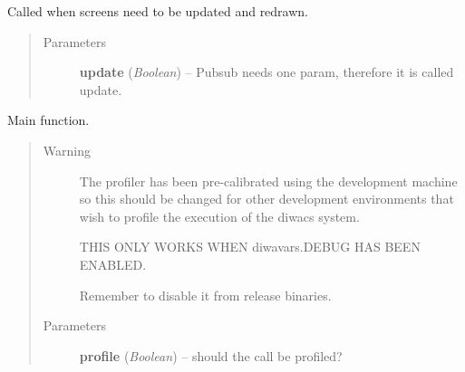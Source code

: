 \documentclass[letterpaper,10pt,english]{sphinxmanual}
\begin{document}
\begin{fulllineitems}
\begin{fulllineitems}
\begin{quote}
\begin{description}
\end{description}\end{quote}

\end{fulllineitems}


\begin{fulllineitems}
\label{diwacs:diwacs.GraphicalUserInterface.UpdateScreens}
Called when screens need to be updated and redrawn.
\begin{quote}\begin{description}
\item[{Parameters}] \leavevmode
\textbf{update} (\emph{Boolean}) -- Pubsub needs one param, therefore it is called update.

\end{description}\end{quote}

\end{fulllineitems}


\end{fulllineitems}


\begin{fulllineitems}
\label{diwacs:diwacs.main}
Main function.
\begin{quote}\begin{description}
\item[{Warning }] \leavevmode
The profiler has been pre-calibrated using the development machine
so this should be changed for other development environments that
wish to profile the execution of the diwacs system.

THIS ONLY WORKS WHEN diwavars.DEBUG HAS BEEN ENABLED.

Remember to disable it from release binaries.

\item[{Parameters}] \leavevmode
\textbf{profile} (\emph{Boolean}) -- should the call be profiled?

\end{description}\end{quote}

\end{fulllineitems}
\end{document}
